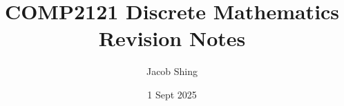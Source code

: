 \titlespacing*{\section}{0pt}{5pt}{5pt}
\titlespacing*{\subsection}{0pt}{5pt}{5pt}
\titlespacing*{\subsubsection}{0pt}{5pt}{5pt}


\newcommand{\Disp}{\displaystyle}
\newcommand{\qe}{\hfill\(\bigtriangledown\)}
\DeclareMathAlphabet{}
\setlength{\parindent}{0.2in}
\setlength{\parskip}{4pt}
\setlength{\columnseprule}{0pt}

\title{\bfseries COMP2121 Discrete Mathematics \\ \Large Revision Notes}

\author{Jacob Shing}
\date{1 Sept 2025}

\setcounter{tocdepth}{2}

\renewcommand{\emph}[1]{\textbf{\large #1}}